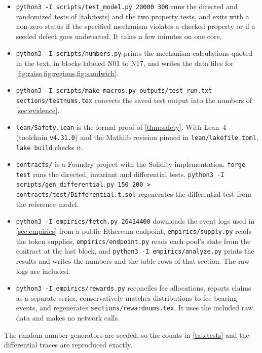 \begin{sloppypar}
\begin{itemize}
\item \texttt{python3 -I scripts/test\_model.py 20000 300} runs the directed and randomized tests of \cref{tab:tests} and the two property tests, and exits with a non-zero status if the specified mechanism violates a checked property or if a seeded defect goes undetected. It takes a few minutes on one core.
\item \texttt{python3 -I scripts/numbers.py} prints the mechanism calculations quoted in the text, in blocks labeled N01 to N17, and writes the data files for \cref{fig:raise,fig:regions,fig:sandwich}.
\item \texttt{python3 -I scripts/make\_macros.py outputs/test\_run.txt sections/testnums.tex} converts the saved test output into the numbers of \cref{sec:evidence}.
\item \texttt{lean/Safety.lean} is the formal proof of \cref{thm:safety}. With Lean~4 (toolchain \texttt{v4.31.0}) and the Mathlib revision pinned in \texttt{lean/lakefile.toml}, \texttt{lake build} checks it.
\item \texttt{contracts/} is a Foundry project with the Solidity implementation. \texttt{forge test} runs the directed, invariant and differential tests. \texttt{python3 -I scripts/gen\_differential.py 150 200 > contracts/test/Differential.t.sol} regenerates the differential test from the reference model.
\item \texttt{python3 -I empirics/fetch.py 26414400} downloads the event logs used in \cref{sec:empirics} from a public Ethereum endpoint, \texttt{empirics/supply.py} reads the token supplies, \texttt{empirics/endpoint.py} reads each pool's state from the contract at the last block, and \texttt{python3 -I empirics/analyze.py} prints the results and writes the numbers and the table rows of that section. The raw logs are included.
\item \texttt{python3 -I empirics/rewards.py} reconciles fee allocations, reports claims as a separate series, conservatively matches distributions to fee-bearing events, and regenerates \texttt{sections/rewardnums.tex}. It uses the included raw data and makes no network calls.
\end{itemize}
\end{sloppypar}

The random number generators are seeded, so the counts in \cref{tab:tests} and the differential traces are reproduced exactly.
